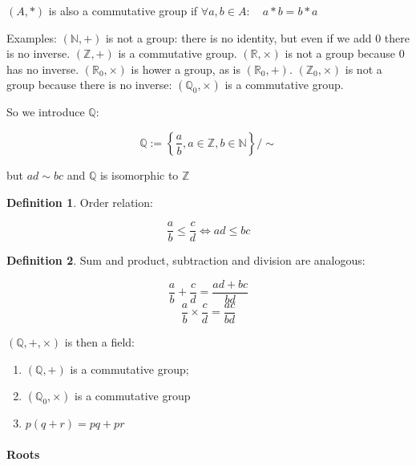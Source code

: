 \documentclass[12pt,a4paper]{report}
\numberwithin{equation}{section}
\theoremstyle{definition}
\newtheorem{definition}{Definition}[section]
\theoremstyle{remark}
\begin{document}
$(A, *)$ is also a commutative group if $\forall a, b \in A: \quad a*b=b*a$

Examples: $(\mathbb{N}, +)$ is not a group: there is no identity, but even if we add 0 there is no inverse. $(\mathbb{Z}, +)$ is a commutative group. $(\mathbb{R}, \times)$ is not a group because 0 has no inverse. $(\mathbb{R}_0, \times)$ is hower a group, as is $(\mathbb{R}_0, +)$. $(\mathbb{Z}_0, \times)$ is not a group because there is no inverse: $(\mathbb{Q}_0, \times)$ is a commutative group.

So we introduce $\mathbb{Q}$:

\begin{equation}
\mathbb{Q}:= \left\lbrace \frac{a}{b}, a \in \mathbb{Z}, b\in \mathbb{N}\right\rbrace  / \sim
\end{equation}

but $ad \sim bc$ and $\mathbb{Q}$ is isomorphic to $\mathbb{Z}$

\begin{definition}
Order relation:

\begin{equation}
\frac a b \leq \frac cd \iff ad \leq bc 
\end{equation}
\end{definition}

\begin{definition}
Sum and product, subtraction and division are analogous:

\begin{equation}
\frac ab + \frac cd = \frac{ad+bc}{bd}
\end{equation}
\begin{equation}
\frac ab \times \frac cd = \frac{ac}{bd}
\end{equation}
\end{definition}

$(\mathbb{Q}, +, \times)$ is then a field:

\begin{enumerate}
\item $(\mathbb{Q}, +)$ is a commutative group;
\item $(\mathbb{Q}_0, \times )$ is a commutative group
\item $p (q+r) = pq + pr$
\end{enumerate}

\paragraph{Roots}
\end{document}
